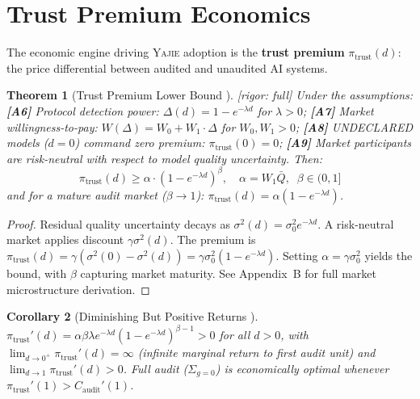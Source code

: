 \documentclass[11pt,a4paper]{article}
\newtheorem{theorem}{Theorem}[section]
\newtheorem{corollary}[theorem]{Corollary}
\theoremstyle{definition}
\theoremstyle{remark}
\newcommand{\rigorFull}{\textcolor{green!60!black}{[rigor: full]}}
\newcommand{\assumptionTag}[1]{\textsf{\textbf{[A#1]}}}
\newcommand{\Yajie}{\textsc{Yajie}}
\newcommand{\undeclaredState}{\textsf{UNDECLARED}}
\newcommand{\trustPremium}{\pi_{\text{trust}}}
\newcommand{\sumGZero}{\Sigma_{g=0}}
\begin{document}
\section{Trust Premium Economics}
\label{sec:trust_premium}
The economic engine driving \Yajie{} adoption is the \textbf{trust premium} $\trustPremium(d)$: the price differential between audited and unaudited AI systems.
\begin{theorem}[Trust Premium Lower Bound ] \label{thm:trust_premium}
\rigorFull
Under the assumptions:
\assumptionTag{6} Protocol detection power: $\Delta(d) = 1 - e^{-\lambda d}$ for $\lambda > 0$;
\assumptionTag{7} Market willingness-to-pay: $W(\Delta) = W_0 + W_1 \cdot \Delta$ for $W_0, W_1 > 0$;
\assumptionTag{8} \undeclaredState{} models ($d = 0$) command zero premium: $\trustPremium(0) = 0$;
\assumptionTag{9} Market participants are risk-neutral with respect to model quality uncertainty.
Then:
\begin{equation}
    \trustPremium(d) \geq \alpha \cdot (1 - e^{-\lambda d})^{\beta}, \quad \alpha = W_1 \bar{Q}, \;\; \beta \in (0, 1]
    \label{eq:premium_bound}
\end{equation}
and for a mature audit market ($\beta \to 1$): $\trustPremium(d) = \alpha(1 - e^{-\lambda d})$.
\end{theorem}
\begin{proof}
Residual quality uncertainty decays as $\sigma^2(d) = \sigma_0^2 e^{-\lambda d}$. A risk-neutral market applies discount $\gamma \sigma^2(d)$. The premium is $\trustPremium(d) = \gamma(\sigma^2(0) - \sigma^2(d)) = \gamma\sigma_0^2(1 - e^{-\lambda d})$. Setting $\alpha = \gamma\sigma_0^2$ yields the bound, with $\beta$ capturing market maturity. See Appendix~B for full market microstructure derivation.
\end{proof}
\begin{corollary}[Diminishing But Positive Returns ]
$\trustPremium'(d) = \alpha\beta\lambda e^{-\lambda d}(1 - e^{-\lambda d})^{\beta-1} > 0$ for all $d > 0$, with $\lim_{d \to 0^+} \trustPremium'(d) = \infty$ (infinite marginal return to first audit unit) and $\lim_{d \to 1} \trustPremium'(d) > 0$. Full audit ($\sumGZero$) is economically optimal whenever $\trustPremium'(1) > C_{\text{audit}}'(1)$.
\end{corollary}
\end{document}
